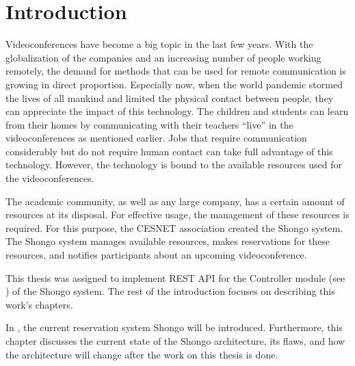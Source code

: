 \chapter*{Introduction}

Videoconferences have become a big topic in the last few years. With the globalization of the companies and an increasing number of people working remotely, the demand for methods that can be used for remote communication is growing in direct proportion.
Especially now, when the world pandemic stormed the lives of all mankind and limited the physical contact between people, they can appreciate the impact of this technology. The children and students can learn from their homes by communicating with their teachers \enquote{live} in the videoconferences as mentioned earlier. Jobs that require communication considerably but do not require human contact can take full advantage of this technology.
However, the technology is bound to the available resources used for the videoconferences.

The academic community, as well as any large company, has a certain amount of resources at its disposal. For effective usage, the management of these resources is required.
For this purpose, the CESNET association created the Shongo system. The Shongo system manages available resources, makes reservations for these resources, and notifies participants about an upcoming videoconference.

This thesis was assigned to implement REST API for the Controller module (see ) of the Shongo system. The rest of the introduction focuses on describing this work's chapters.

In , the current reservation system Shongo will be introduced. Furthermore, this chapter discusses the current state of the Shongo architecture, its flaws, and how the architecture will change after the work on this thesis is done.

